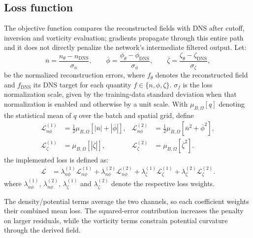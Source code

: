 \documentclass[authoryear,preprint,review,12pt]{elsarticle}
\begin{document}
\subsection{Loss function}
The objective function compares the reconstructed fields with DNS after cutoff, inversion and vorticity evaluation; gradients propagate through this entire path and it does not directly penalize the network's intermediate filtered output. Let:
\begin{equation}
    \overline{n}=\frac{n_\theta-n_{\mathrm{DNS}}}{\sigma_n},\qquad
    \overline{\phi}=\frac{\phi_\theta-\phi_{\mathrm{DNS}}}{\sigma_\phi},\qquad
    \overline{\zeta}=\frac{\zeta_\theta-\zeta_{\mathrm{DNS}}}{\sigma_\zeta},
\end{equation}
be the normalized reconstruction errors, where $f_\theta$ denotes the reconstructed field and $f_{\mathrm{DNS}}$ its DNS target for each quantity $f\in\{n,\phi,\zeta\}$. $\sigma_f$ is the loss normalization scale, given by the training-data standard deviation when that normalization is enabled and otherwise by a unit scale. With $\mu_{B,\Omega}[q]$ denoting the statistical mean of $q$ over the batch and spatial grid, define
\begin{align}
    \mathcal{L}_{n\phi}^{(1)}
    &=\tfrac12\mu_{B,\Omega}\!\left[|\overline{n}|+|\overline{\phi}|\right],&
    \mathcal{L}_{n\phi}^{(2)}
    &=\tfrac12\mu_{B,\Omega}\!\left[\overline{n}^2+\overline{\phi}^2\right],\\
    \mathcal{L}_{\zeta}^{(1)}
    &=\mu_{B,\Omega}\!\left[|\overline{\zeta}|\right],&
    \mathcal{L}_{\zeta}^{(2)}
    &=\mu_{B,\Omega}\!\left[\overline{\zeta}^2\right].
\end{align}
the implemented loss is defined as:
\begin{align}
    \mathcal{L}
    &=\lambda_{n\phi}^{(1)}\mathcal{L}_{n\phi}^{(1)}
      +\lambda_{n\phi}^{(2)}\mathcal{L}_{n\phi}^{(2)}
      +\lambda_{\zeta}^{(1)}\mathcal{L}_{\zeta}^{(1)}
      +\lambda_{\zeta}^{(2)}\mathcal{L}_{\zeta}^{(2)}.
    \label{eq:training_loss}
\end{align}
where $\lambda_{n\phi}^{(1)}$, $\lambda_{n\phi}^{(2)}$, $\lambda_\zeta^{(1)}$ and $\lambda_\zeta^{(2)}$ denote the respective loss weights.

The density/potential terms average the two channels, so each coefficient weights their combined mean loss. The squared-error contribution increases the penalty on larger residuals, while the vorticity terms constrain potential curvature through the derived field.
\end{document}
